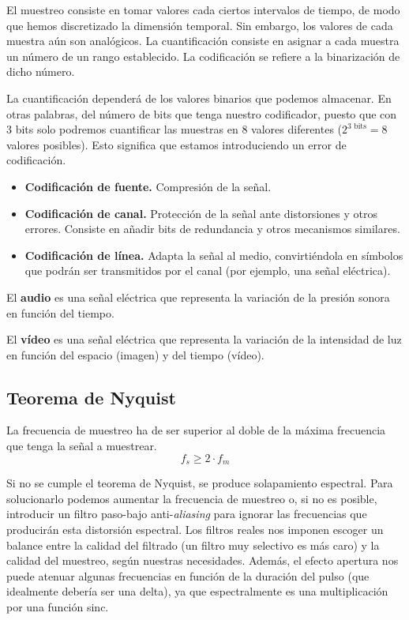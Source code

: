 \documentclass[10pt]{book}
\begin{document}
El muestreo consiste en tomar valores cada ciertos intervalos de tiempo, de modo que hemos discretizado la dimensión temporal. Sin embargo, los valores de cada muestra aún son analógicos. La cuantificación consiste en asignar a cada muestra un número de un rango establecido. La codificación se refiere a la binarización de dicho número.

La cuantificación dependerá de los valores binarios que podemos almacenar. En otras palabras, del número de bits que tenga nuestro codificador, puesto que con 3 bits solo podremos cuantificar las muestras en 8 valores diferentes ($2^{3\text{ bits}} = 8$ valores posibles). Esto significa que estamos introduciendo un error de codificación.

\begin{itemize}
  \item \textbf{Codificación de fuente.} Compresión de la señal.
  \item \textbf{Codificación de canal.} Protección de la señal ante distorsiones y otros errores. Consiste en añadir bits de redundancia y otros mecanismos similares.
  \item \textbf{Codificación de línea.} Adapta la señal al medio, convirtiéndola en símbolos que podrán ser transmitidos por el canal (por ejemplo, una señal eléctrica).
\end{itemize}

El \textbf{audio} es una señal eléctrica que representa la variación de la presión sonora en función del tiempo.

El \textbf{vídeo} es una señal eléctrica que representa la variación de la intensidad de luz en función del espacio (imagen) y del tiempo (vídeo).

\subsection{Teorema de Nyquist}

La frecuencia de muestreo ha de ser superior al doble de la máxima frecuencia que tenga la señal a muestrear.
\[ f_s \geq 2 \cdot f_m \]

Si no se cumple el teorema de Nyquist, se produce solapamiento espectral. Para solucionarlo podemos aumentar la frecuencia de muestreo o, si no es posible, introducir un filtro paso-bajo anti-\textit{aliasing} para ignorar las frecuencias que producirán esta distorsión espectral. Los filtros reales nos imponen escoger un balance entre la calidad del filtrado (un filtro muy selectivo es más caro) y la calidad del muestreo, según nuestras necesidades. Además, el efecto apertura nos puede atenuar algunas frecuencias en función de la duración del pulso (que idealmente debería ser una delta), ya que espectralmente es una multiplicación por una función sinc.
\end{document}
